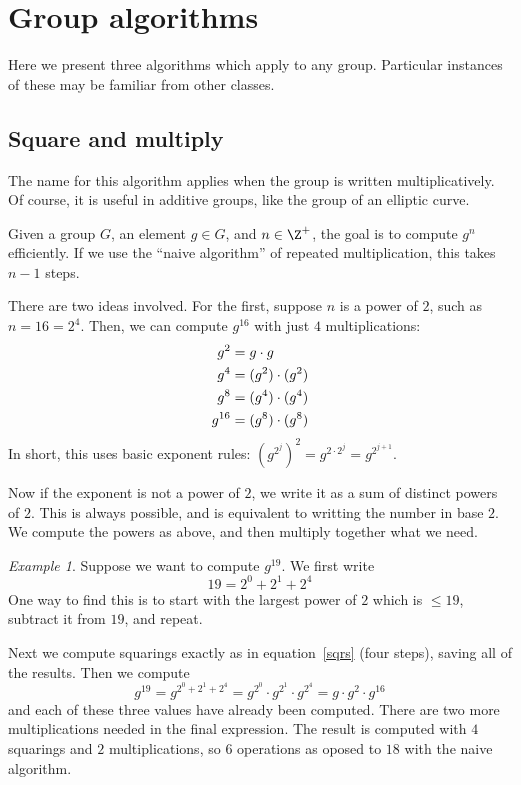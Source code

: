 \documentclass[12pt]{amsart}
\theoremstyle{plain}
\theoremstyle{definition}
\theoremstyle{remark}
\newtheorem*{exam}{Example}
\begin{document}
\section{Group algorithms}

Here we present three algorithms which apply to any group.  Particular
instances of these may be familiar from other classes.

\subsection{Square and multiply}
The name for this algorithm applies when the group is written
multiplicatively.  Of course, it is useful in additive groups, like
the group of an elliptic curve.

Given a group $G$, an element $g\in G$, and $n\in\Z^+$, the goal is to
compute $g^n$ efficiently.  If we use the ``naive algorithm'' of
repeated multiplication, this takes $n-1$ steps.

There are two ideas involved.  For the first, suppose $n$ is a power
of $2$, such as $n=16=2^4$.  Then, we can compute $g^{16}$ with just
$4$ multiplications:
\begin{align}
g^2&= g\cdot g \label{sqrs}\\
g^4&= (g^2)\cdot (g^2) \notag\\
g^8&= (g^4)\cdot (g^4) \notag \\
g^{16}&= (g^8)\cdot (g^8) \notag
\end{align}
In short, this uses basic exponent rules: $(g^{2^j})^2=g^{2\cdot
  2^j}=g^{2^{j+1}}$.

Now if the exponent is not a power of $2$, we write it as a sum of
distinct powers of $2$.  This is always possible, and is equivalent to
writting the number in base $2$.  We compute the powers as above, and
then multiply together what we need.
\begin{exam}
  Suppose we want to compute $g^{19}$.  We first write
  \[ 19=2^0+2^1+2^4\]
  One way to find this is to start with the largest power of $2$ which
  is $\leq 19$, subtract it from $19$, and repeat.

  Next we compute squarings exactly as in equation~\eqref{sqrs} (four
  steps), saving all of the results.  Then we compute
  \[ g^{19} = g^{2^0+2^1+2^4} = g^{2^0}\cdot g^{2^1}\cdot g^{2^4}
  = g\cdot g^2\cdot g^{16}\]
and each of these three values have already been computed.  There are
two more multiplications needed in the final expression.  The result
is computed with $4$ squarings and $2$ multiplications, so $6$
operations as oposed to $18$ with the naive algorithm.
\end{exam}
\end{document}
